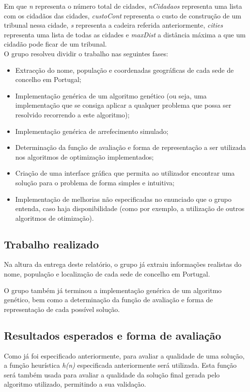 \documentclass[11pt,a4paper,reqno]{article}
\numberwithin{equation}{section}
\begin{document}
Em que \textit{n} representa o número total de cidades, \textit{nCidadaos} representa uma lista com os cidadãos das cidades, \textit{custoCont} representa o custo de construção de um tribunal nessa cidade, \textit{s} representa a cadeira referida anteriormente, \textit{cities} representa uma lista de todas as cidades e \textit{maxDist} a distância máxima a que um cidadão pode ficar de um tribunal.\\

O grupo resolveu dividir o trabalho nas seguintes fases:
\begin{itemize}
\item Extracção do nome, população e coordenadas geográficas de cada sede de concelho em Portugal;
\item Implementação genérica de um algoritmo genético (ou seja, uma implementação que se consiga aplicar a qualquer problema que possa ser resolvido recorrendo a este algoritmo);
\item Implementação genérica de arrefecimento simulado;
\item Determinação da função de avaliação e forma de representação a ser utilizada nos algoritmos de optimização implementados;
\item Criação de uma interface gráfica que permita ao utilizador encontrar uma solução para o problema de forma simples e intuitiva;
\item Implementação de melhorias não especificadas no enunciado que o grupo entenda, caso haja disponibilidade (como por exemplo, a utilização de outros algoritmos de otimização).
\end{itemize}


\subsection{Trabalho realizado}
Na altura da entrega deste relatório, o grupo já extraiu informações realistas do nome, população e localização de cada sede de concelho em Portugal.

O grupo também já terminou a implementação genérica de um algoritmo genético, bem como a determinação da função de avaliação e forma de representação de cada possível solução.

\subsection{Resultados esperados e forma de avaliação}
Como já foi especificado anteriormente, para avaliar a qualidade de uma solução, a função heurística \textit{h(n)} especificada anteriormente será utilizada. Esta função será também usada para avaliar a qualidade da solução final gerada pelo algoritmo utilizado, permitindo a sua validação.
\end{document}
